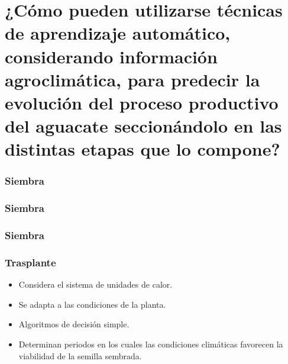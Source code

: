 \documentclass[aspectratio=169]{beamer}
\begin{document}
\section{¿Cómo pueden utilizarse técnicas de aprendizaje automático, considerando información agroclimática, para predecir la evolución del proceso productivo del aguacate seccionándolo en las distintas etapas que lo compone?}


\begin{frame}\frametitle<1>{\hfill Siembra}
\frametitle<2>{\hfill Siembra}
\frametitle<3>{\hfill Siembra}
\frametitle<4>{Trasplante}
    \vspace{-1cm}
		\begin{minipage}{0.5\textwidth}
            \vspace{-6cm}\begin{block}{}
                \begin{itemize}
				\item Considera el sistema de unidades de calor.
                    \item Se adapta a las condiciones de la planta.
                    \item Algoritmos de decisión simple.
                    \item Determinan periodos en los cuales las condiciones climáticas favorecen la viabilidad de la semilla sembrada.
			\end{itemize}
            \end{block}
		\end{minipage}%
        \begin{minipage}{0.5\textwidth}
        \vspace{0.5cm}
        

\end{minipage}
\end{frame}
\end{document}

